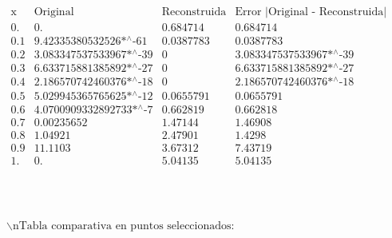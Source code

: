 \documentclass{article}
\begin{document}
\noindent\(\begin{array}{cccc}
 \text{x} & \text{Original} & \text{Reconstruida} & \text{Error $|$Original - Reconstruida$|$} \\
 0. & 0. & 0.684714 & 0.684714 \\
 0.1 & \text{9.42335380532526$\grave{ }$*${}^{\wedge}$-61} & 0.0387783 & 0.0387783 \\
 0.2 & \text{3.083347537533967$\grave{ }$*${}^{\wedge}$-39} & 0 & \text{3.083347537533967$\grave{ }$*${}^{\wedge}$-39} \\
 0.3 & \text{6.633715881385892$\grave{ }$*${}^{\wedge}$-27} & 0 & \text{6.633715881385892$\grave{ }$*${}^{\wedge}$-27} \\
 0.4 & \text{2.186570742460376$\grave{ }$*${}^{\wedge}$-18} & 0 & \text{2.186570742460376$\grave{ }$*${}^{\wedge}$-18} \\
 0.5 & \text{5.029945365765625$\grave{ }$*${}^{\wedge}$-12} & 0.0655791 & 0.0655791 \\
 0.6 & \text{4.0700909332892733$\grave{ }$*${}^{\wedge}$-7} & 0.662819 & 0.662818 \\
 0.7 & 0.00235652 & 1.47144 & 1.46908 \\
 0.8 & 1.04921 & 2.47901 & 1.4298 \\
 0.9 & 11.1103 & 3.67312 & 7.43719 \\
 1. & 0. & 5.04135 & 5.04135 \\
\end{array}\)

\noindent\(\begin{array}{cc}
 
\begin{array}{cc}
  &  \\
\end{array}
 &  \\
\end{array}\)

\noindent\(\text{$\backslash $nTabla comparativa en puntos seleccionados:}\)
\end{document}
